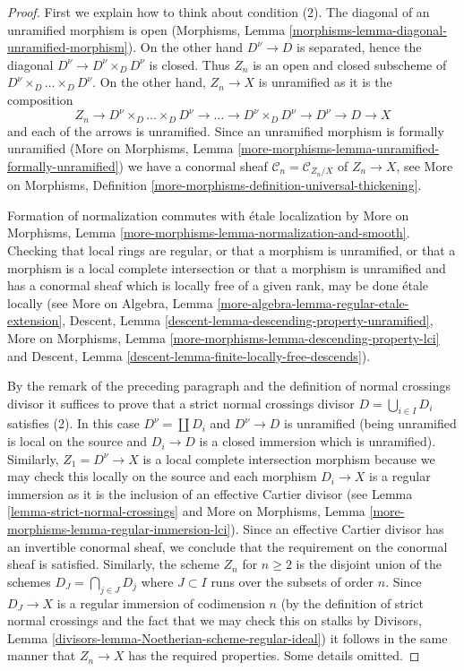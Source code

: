 \begin{proof}
First we explain how to think about condition (2).
The diagonal of an unramified morphism is open
(Morphisms, Lemma \ref{morphisms-lemma-diagonal-unramified-morphism}).
On the other hand $D^\nu \to D$ is separated, hence the
diagonal $D^\nu \to D^\nu \times_D D^\nu$ is closed.
Thus $Z_n$ is an open and closed subscheme of
$D^\nu \times_D \ldots \times_D D^\nu$. On the other hand,
$Z_n \to X$ is unramified as it is the composition
$$
Z_n \to D^\nu \times_D \ldots \times_D D^\nu \to \ldots \to
D^\nu \times_D D^\nu \to D^\nu \to D \to X
$$
and each of the arrows is unramified.
Since an unramified morphism is formally unramified
(More on Morphisms, Lemma
\ref{more-morphisms-lemma-unramified-formally-unramified})
we have a conormal sheaf
$\mathcal{C}_n = \mathcal{C}_{Z_n/X}$ of $Z_n \to X$, see
More on Morphisms, Definition
\ref{more-morphisms-definition-universal-thickening}.

\medskip\noindent
Formation of normalization commutes with \'etale localization by
More on Morphisms, Lemma \ref{more-morphisms-lemma-normalization-and-smooth}.
Checking that local rings are regular, or that
a morphism is unramified, or that a morphism is a
local complete intersection or that a morphism is
unramified and has a conormal sheaf which is
locally free of a given rank, may be done \'etale locally (see
More on Algebra, Lemma \ref{more-algebra-lemma-regular-etale-extension},
Descent, Lemma \ref{descent-lemma-descending-property-unramified},
More on Morphisms, Lemma \ref{more-morphisms-lemma-descending-property-lci}
and
Descent, Lemma \ref{descent-lemma-finite-locally-free-descends}).

\medskip\noindent
By the remark of the preceding paragraph and the definition
of normal crossings divisor it suffices to prove that a
strict normal crossings divisor $D = \bigcup_{i \in I} D_i$
satisfies (2). In this case $D^\nu = \coprod D_i$
and $D^\nu \to D$ is unramified (being unramified
is local on the source and $D_i \to D$ is a closed
immersion which is unramified). Similarly, $Z_1 = D^\nu \to X$
is a local complete intersection morphism because we may
check this locally on the source and each morphism $D_i \to X$
is a regular immersion as it is the inclusion of an effective Cartier divisor
(see Lemma \ref{lemma-strict-normal-crossings} and
More on Morphisms, Lemma \ref{more-morphisms-lemma-regular-immersion-lci}).
Since an effective Cartier divisor has an invertible
conormal sheaf, we conclude that the requirement on the
conormal sheaf is satisfied.
Similarly, the scheme $Z_n$ for $n \geq 2$ is the disjoint union
of the schemes $D_J = \bigcap_{j \in J} D_j$ where $J \subset I$
runs over the subsets of order $n$. Since $D_J \to X$ is
a regular immersion of codimension $n$
(by the definition of strict normal crossings and the
fact that we may check this on stalks by
Divisors, Lemma \ref{divisors-lemma-Noetherian-scheme-regular-ideal})
it follows in the same manner that $Z_n \to X$ has the required
properties. Some details omitted.


\end{proof}
